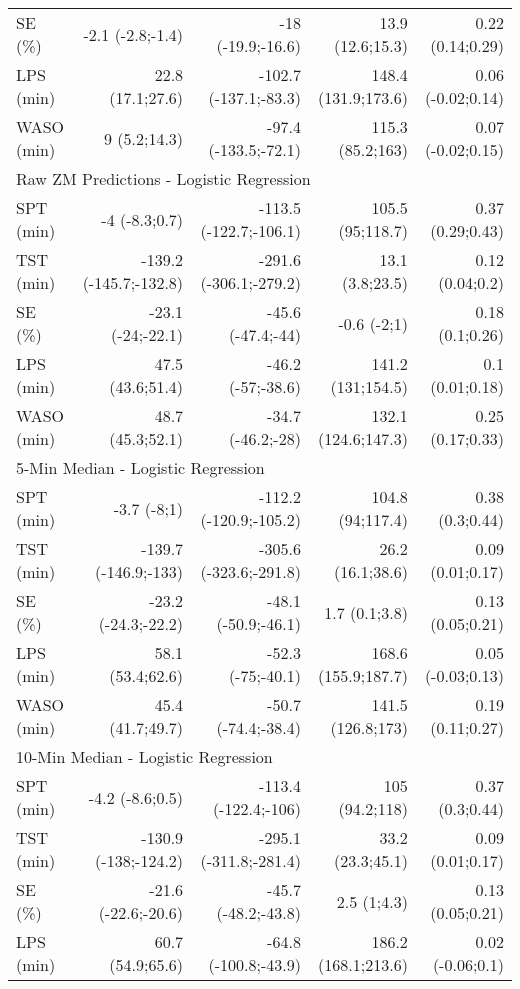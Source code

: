 \documentclass[
  10pt,
]{scrbook}
\begin{document}
\begin{longtable}{lrrrr}
SE (\%) & -2.1 (-2.8;-1.4) & -18 (-19.9;-16.6) & 13.9 (12.6;15.3) & 0.22 (0.14;0.29) \\ 
LPS (min) & 22.8 (17.1;27.6) & -102.7 (-137.1;-83.3) & 148.4 (131.9;173.6) & 0.06 (-0.02;0.14) \\ 
WASO (min) & 9 (5.2;14.3) & -97.4 (-133.5;-72.1) & 115.3 (85.2;163) & 0.07 (-0.02;0.15) \\ 
\midrule
\multicolumn{5}{l}{Raw ZM Predictions - Logistic Regression} \\ 
\midrule
SPT (min) & -4 (-8.3;0.7) & -113.5 (-122.7;-106.1) & 105.5 (95;118.7) & 0.37 (0.29;0.43) \\ 
TST (min) & -139.2 (-145.7;-132.8) & -291.6 (-306.1;-279.2) & 13.1 (3.8;23.5) & 0.12 (0.04;0.2) \\ 
SE (\%) & -23.1 (-24;-22.1) & -45.6 (-47.4;-44) & -0.6 (-2;1) & 0.18 (0.1;0.26) \\ 
LPS (min) & 47.5 (43.6;51.4) & -46.2 (-57;-38.6) & 141.2 (131;154.5) & 0.1 (0.01;0.18) \\ 
WASO (min) & 48.7 (45.3;52.1) & -34.7 (-46.2;-28) & 132.1 (124.6;147.3) & 0.25 (0.17;0.33) \\ 
\midrule
\multicolumn{5}{l}{5-Min Median - Logistic Regression} \\ 
\midrule
SPT (min) & -3.7 (-8;1) & -112.2 (-120.9;-105.2) & 104.8 (94;117.4) & 0.38 (0.3;0.44) \\ 
TST (min) & -139.7 (-146.9;-133) & -305.6 (-323.6;-291.8) & 26.2 (16.1;38.6) & 0.09 (0.01;0.17) \\ 
SE (\%) & -23.2 (-24.3;-22.2) & -48.1 (-50.9;-46.1) & 1.7 (0.1;3.8) & 0.13 (0.05;0.21) \\ 
LPS (min) & 58.1 (53.4;62.6) & -52.3 (-75;-40.1) & 168.6 (155.9;187.7) & 0.05 (-0.03;0.13) \\ 
WASO (min) & 45.4 (41.7;49.7) & -50.7 (-74.4;-38.4) & 141.5 (126.8;173) & 0.19 (0.11;0.27) \\ 
\midrule
\multicolumn{5}{l}{10-Min Median - Logistic Regression} \\ 
\midrule
SPT (min) & -4.2 (-8.6;0.5) & -113.4 (-122.4;-106) & 105 (94.2;118) & 0.37 (0.3;0.44) \\ 
TST (min) & -130.9 (-138;-124.2) & -295.1 (-311.8;-281.4) & 33.2 (23.3;45.1) & 0.09 (0.01;0.17) \\ 
SE (\%) & -21.6 (-22.6;-20.6) & -45.7 (-48.2;-43.8) & 2.5 (1;4.3) & 0.13 (0.05;0.21) \\ 
LPS (min) & 60.7 (54.9;65.6) & -64.8 (-100.8;-43.9) & 186.2 (168.1;213.6) & 0.02 (-0.06;0.1) \\ 

\end{longtable}
\end{document}
